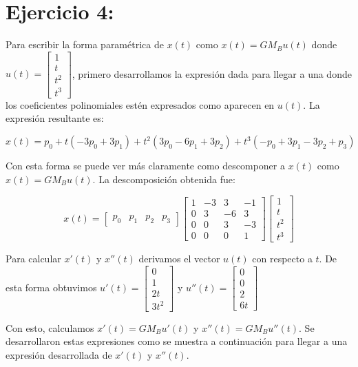 \documentclass{article}
\begin{document}
\section*{Ejercicio 4:}
Para escribir la forma paramétrica de $x(t)$ como  $x(t) = G M_B u(t)$ donde $u(t) =
\left[ 
\begin{array}{c}
1 \\
t \\
t^2 \\
t^3
\end{array}
\right]
$, primero desarrollamos la expresión dada para llegar a una donde los coeficientes polinomiales estén expresados como aparecen en $u(t)$. La expresión resultante es:

$$
x(t) = p_0 + t(-3p_0+3p_1) + t^2(3p_0-6p_1+3p_2) + t^3(-p_0+3p_1-3p_2+p_3)
$$

Con esta forma se puede ver más claramente como descomponer a  $x(t)$ como  $x(t) = G M_B u(t)$. La descomposición obtenida fue:

$$
x(t) = 
\begin{bmatrix}
p_0 & p_1 & p_2 & p_3
\end{bmatrix}
\begin{bmatrix}
1 & -3 & 3 & -1 \\
0 & 3 & -6 & 3 \\
0 & 0 & 3 & -3 \\
0 & 0 & 0 & 1
\end{bmatrix}
\begin{bmatrix}
1 \\
t \\
t^2 \\
t^3
\end{bmatrix}
$$

Para calcular $x'(t)$ y $x''(t)$  derivamos el vector $u(t)$ con respecto a $t$. De esta forma obtuvimos $u'(t) =
\begin{bmatrix}
0 \\ 1 \\ 2t \\ 3t^2
\end{bmatrix}
$ y $u''(t) =
\begin{bmatrix}
0 \\ 0 \\ 2 \\ 6t
\end{bmatrix}
$

Con esto, calculamos $x'(t) = G M_B u'(t)$ y $x''(t) = G M_B u''(t)$. Se desarrollaron estas expresiones como se muestra a continuación para llegar a una expresión desarrollada de $x'(t)$ y $x''(t)$.
\end{document}
